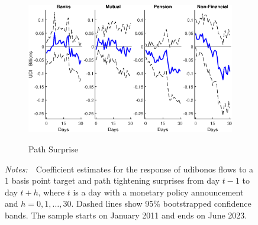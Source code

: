 \documentclass[a4paper, 12pt]{article}
\newcommand{\figtext}[1]{
	\vspace{-1ex}
	\captionsetup{justification=justified,font=footnotesize}
	\caption*{#1}
}
\newcommand{\fignotes}[1]{\figtext{\emph{Notes:~}~#1}}
\providecommand{\lastobsflwbdm}{June 2023}
\providecommand{\idxh}{h}
\begin{document}
\begin{appendices}
\begin{landscape}
\begin{figure}[tbph]
\begin{center}
\begin{minipage}{\linewidth}
\begin{center}
						\begin{subfigure}[t]{\linewidth}
							\includegraphics[height=0.33\textheight,width=\linewidth]{../Figures/Path11UdibonosCateg2.eps} \\
							\vspace{-0.35cm}
							\caption{Path Surprise} \label{subfig:Path11UdibonosCateg2}
						\end{subfigure}
						\vspace{-0.45cm}
					\end{center}
					\fignotes{Coefficient estimates for the response of udibonos flows to a 1 basis point target and path tightening surprises from day \(t - 1\) to day \(t + \idxh\), where \(t\) is a day with a monetary policy announcement and \(\idxh = 0, 1, \ldots, 30\). Dashed lines show 95\% bootstrapped confidence bands. The sample starts on January 2011 and ends on \lastobsflwbdm.}
				\end{minipage}
			\end{center}
		\end{figure}
	\end{landscape}

\end{appendices}
\end{document}
